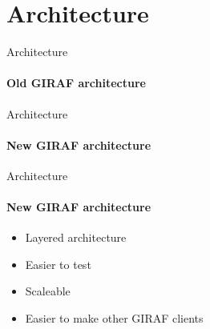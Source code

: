 \section{Architecture}
\begin{frame}[t]{Architecture}\framesubtitle{Old GIRAF architecture}
\end{frame}

\begin{frame}[t]{Architecture}\framesubtitle{New GIRAF architecture}
    \centering
    \scalebox{0.6}{%
    }
\end{frame}

\begin{frame}[t]{Architecture}\framesubtitle{New GIRAF architecture}
    \begin{itemize}
        \item Layered architecture
        \item Easier to test
        \item Scaleable
        \item Easier to make other GIRAF clients
    \end{itemize}
\end{frame}
